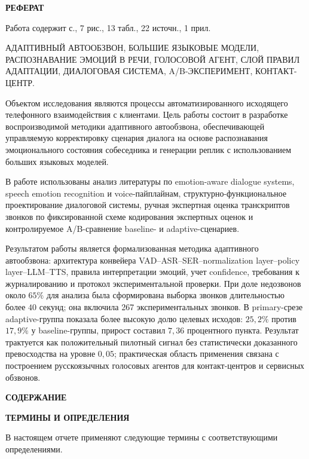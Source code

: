 \documentclass[a4paper,14pt]{extarticle}
\newcommand{\VkrStructuralSection}[1]{%
  \FloatBarrier
  \clearpage
  \phantomsection
  \addcontentsline{toc}{section}{#1}%
  \begin{center}\bfseries #1\end{center}%
  \par\nopagebreak\vspace{12pt}%
}
\newcommand{\VkrStructuralSectionNoToc}[1]{%
  \begin{center}\bfseries #1\end{center}%
  \par\nopagebreak\vspace{12pt}%
}
\renewcommand{\texttt}[1]{\textnormal{#1}}
\begin{document}
\VkrStructuralSectionNoToc{РЕФЕРАТ}\label{ux440ux435ux444ux435ux440ux430ux442}

Работа содержит \pageref{LastPage} с., 7 рис., 13 табл., 22 источн., 1
прил.

АДАПТИВНЫЙ АВТООБЗВОН, БОЛЬШИЕ ЯЗЫКОВЫЕ МОДЕЛИ, РАСПОЗНАВАНИЕ ЭМОЦИЙ В
РЕЧИ, ГОЛОСОВОЙ АГЕНТ, СЛОЙ ПРАВИЛ АДАПТАЦИИ, ДИАЛОГОВАЯ СИСТЕМА,
A/B-ЭКСПЕРИМЕНТ, КОНТАКТ-ЦЕНТР.

Объектом исследования являются процессы автоматизированного исходящего
телефонного взаимодействия с клиентами. Цель работы состоит в разработке
воспроизводимой методики адаптивного автообзвона, обеспечивающей
управляемую корректировку сценария диалога на основе распознавания
эмоционального состояния собеседника и генерации реплик с использованием
больших языковых моделей.

В работе использованы анализ литературы по emotion-aware dialogue
systems, speech emotion recognition и voice-пайплайнам,
структурно-функциональное проектирование диалоговой системы, ручная
экспертная оценка транскриптов звонков по фиксированной схеме
кодирования экспертных оценок и контролируемое A/B-сравнение
\texttt{baseline}- и \texttt{adaptive}-сценариев.

Результатом работы является формализованная методика адаптивного
автообзвона: архитектура конвейера
\texttt{VAD}--\texttt{ASR}--\texttt{SER}--normalization layer--policy
layer--\texttt{LLM}--\texttt{TTS}, правила интерпретации эмоций, учет
\texttt{confidence}, требования к журналированию и протокол
экспериментальной проверки. При доле недозвонов около \(65\%\) для
анализа была сформирована выборка звонков длительностью более \(40\)
секунд; она включила 267 экспериментальных звонков. В primary-срезе
adaptive-группа показала более высокую долю целевых исходов:
\(25{,}2\%\) против \(17{,}9\%\) у baseline-группы, прирост составил
\(7{,}36\) процентного пункта. Результат трактуется как положительный
пилотный сигнал без статистически доказанного превосходства на уровне
\(0{,}05\); практическая область применения связана с построением
русскоязычных голосовых агентов для контакт-центров и сервисных
обзвонов.

\clearpage

\VkrStructuralSectionNoToc{СОДЕРЖАНИЕ}
\makeatletter{}\makeatother
\clearpage

\VkrStructuralSection{ТЕРМИНЫ И ОПРЕДЕЛЕНИЯ}\label{ux442ux435ux440ux43cux438ux43dux44b-ux438-ux43eux43fux440ux435ux434ux435ux43bux435ux43dux438ux44f}

В настоящем отчете применяют следующие термины с соответствующими
определениями.
\end{document}
